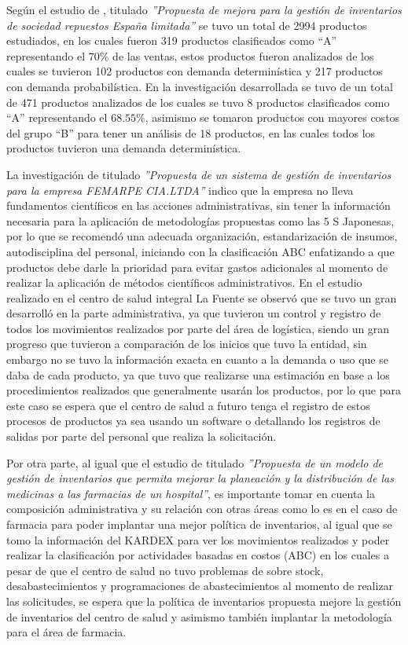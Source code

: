 \begin{discusiones}
Según el estudio de \cite{gallardo2016propuesta}, titulado \textsl{''Propuesta de mejora para la gestión de inventarios de sociedad repuestos España limitada''} se tuvo un total de 2994 productos estudiados, en los cuales fueron 319 productos clasificados como ``A'' representando el 70$\%$ de las ventas, estos productos fueron analizados de los cuales se tuvieron 102 productos con demanda determinística y 217 productos con demanda probabilística. En la investigación desarrollada se tuvo de un total de 471 productos analizados de los cuales se tuvo 8 productos clasificados como ``A'' representando el $68.55\%$, asimismo se tomaron productos con mayores costos del grupo ``B'' para tener un análisis de 18 productos, en las cuales todos los productos tuvieron una demanda determinística.

La investigación de \cite{loja2015propuesta} titulado \textsl{''Propuesta de un sistema de gestión de inventarios para la empresa FEMARPE CIA.LTDA''} indico que la empresa no lleva fundamentos científicos en las acciones administrativas, sin tener la información necesaria para la aplicación de metodologías propuestas como las 5 S Japonesas, por lo que se recomendó una adecuada organización, estandarización de insumos, autodisciplina del personal, iniciando con la clasificación ABC enfatizando a que productos debe darle la prioridad para evitar gastos adicionales al momento de realizar la aplicación de métodos científicos administrativos. En el estudio realizado en el centro de salud integral La Fuente se observó que se tuvo un gran desarrolló en la parte administrativa, ya que tuvieron un control y registro de todos los movimientos realizados por parte del área de logística, siendo un gran progreso que tuvieron a comparación de los inicios que tuvo la entidad, sin embargo no se tuvo la información exacta en cuanto a la demanda o uso que se daba de cada producto, ya que tuvo que realizarse una estimación en base a los  procedimientos realizados que generalmente usarán los productos, por lo que para este caso se espera que el centro de salud a futuro tenga el registro de estos procesos de productos ya sea usando un software o detallando los registros de salidas por parte del personal que realiza la solicitación.

Por otra parte, al igual que el estudio de \cite{caceres2010propuesta} titulado \textsl{''Propuesta de un modelo de gestión de inventarios que permita mejorar la planeación y la distribución de las medicinas a las farmacias de un hospital''}, es importante tomar en cuenta la composición administrativa y su relación con otras áreas como lo es en el caso de farmacia para poder implantar una mejor política de inventarios, al igual que se tomo la información del KARDEX para ver los movimientos realizados y poder realizar la clasificación por actividades basadas en costos (ABC) en los cuales a pesar de que el centro de salud no tuvo problemas de sobre stock, desabastecimientos y programaciones de abastecimientos al momento de realizar las solicitudes, se espera que la política de inventarios propuesta mejore la gestión de inventarios del centro de salud y asimismo también implantar la metodología para el área de farmacia.


\end{discusiones}
